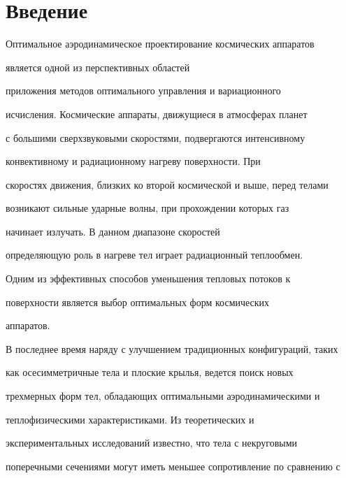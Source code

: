 \maketitle


\label{begin}








\section*{Введение}





Оптимальное аэродинамическое проектирование космических аппаратов


является одной из перспективных областей


приложения методов оптимального управления и вариационного


исчисления. Космические аппараты, движущиеся в атмосферах планет


с большими сверхзвуковыми скоростями, подвергаются интенсивному


конвективному и радиационному нагреву поверхности. При


скоростях движения, близких ко второй космической и выше, перед телами


возникают сильные ударные волны, при прохождении которых газ


начинает излучать. В данном диапазоне скоростей


определяющую роль в нагреве тел играет радиационный теплообмен.


Одним из эффективных способов уменьшения тепловых потоков к


поверхности является выбор оптимальных форм космических


аппаратов.





В последнее время наряду с улучшением традиционных конфигураций, таких


как осесимметричные тела и плоские крылья, ведется поиск новых


трехмерных форм тел, обладающих оптимальными аэродинамическими и


теплофизическими характеристиками. Из теоретических и


экспериментальных исследований известно, что тела с некруговыми


поперечными сечениями могут иметь меньшее сопротивление по сравнению с


